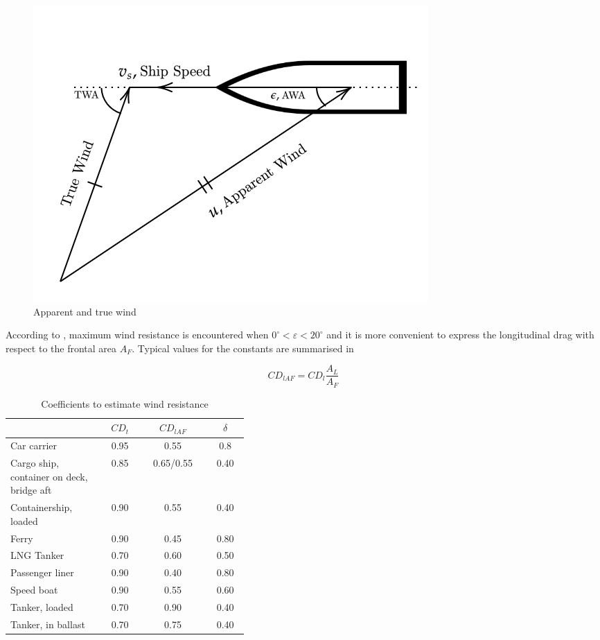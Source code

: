 \begin{figure}
    \centering
        \includegraphics[width=.6\textwidth]{02_figures/AWA_TWAc.png}
        \caption{Apparent and true wind }
        \label{fig:AWA_TWA}
\end{figure}

According to , maximum wind resistance is encountered when $0^\circ<\varepsilon<20^\circ$ and it is more convenient to express the longitudinal drag with respect to the frontal area $A_F$. Typical values for the constants are summarised in 

\begin{equation}
    \label{eqn:CDlaf}
    CD_{lAF} = CD_l \frac{A_L}{A_F}
\end{equation}

\begin{table}[ht]
    \footnotesize
    \centering
    {\begin{tabular}{ p{0.4\linewidth} c c c }
    \hline
    &\textbf{$CD_t$} & \textbf{$CD_{lAF}$} & \textbf{$\delta$} \\
    \hline
    Car carrier & 0.95 & 0.55 & 0.8 \\
    Cargo ship, container on deck, bridge aft & 0.85 & 0.65/0.55 & 0.40 \\
    Containership, loaded & 0.90 & 0.55 & 0.40 \\
    Ferry & 0.90 & 0.45 & 0.80\\
    LNG Tanker & 0.70 & 0.60 & 0.50 \\
    Passenger liner & 0.90 & 0.40 & 0.80 \\
    Speed boat & 0.90 & 0.55 & 0.60 \\
    Tanker, loaded & 0.70 & 0.90 & 0.40 \\
    Tanker, in ballast & 0.70 & 0.75 & 0.40 \\
    \hline        
    \end{tabular}}
\caption{Coefficients to estimate wind resistance}\label{tbl:BlendermannCoeff}
\end{table}

